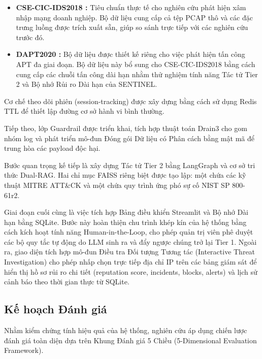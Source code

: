\documentclass[12pt,a4paper]{article}
\begin{document}
\begin{itemize}
    \item \textbf{CSE-CIC-IDS2018 \cite{sharafaldin2018}:} Tiêu chuẩn thực tế cho nghiên cứu phát hiện xâm nhập mạng doanh nghiệp. Bộ dữ liệu cung cấp cả tệp PCAP thô và các đặc trưng luồng được trích xuất sẵn, giúp so sánh trực tiếp với các nghiên cứu trước đó.
    \item \textbf{DAPT2020 \cite{dapt2020}:} Bộ dữ liệu được thiết kế riêng cho việc phát hiện tấn công APT đa giai đoạn. Bộ dữ liệu này bổ sung cho CSE-CIC-IDS2018 bằng cách cung cấp các chuỗi tấn công dài hạn nhằm thử nghiệm tính năng Tác tử Tier 2 và Bộ nhớ Rủi ro Dài hạn của SENTINEL.
\end{itemize}

Cơ chế theo dõi phiên (session-tracking) được xây dựng bằng cách sử dụng Redis TTL để thiết lập đường cơ sở hành vi bình thường.

Tiếp theo, lớp Guardrail được triển khai, tích hợp thuật toán Drain3 cho gom nhóm log và phát triển mô-đun Đóng gói Dữ liệu có Phân cách bằng mật mã để trung hòa các payload độc hại.

Bước quan trọng kế tiếp là xây dựng Tác tử Tier 2 bằng LangGraph và cơ sở tri thức Dual-RAG. Hai chỉ mục FAISS riêng biệt được tạo lập: một chứa các kỹ thuật MITRE ATT\&CK và một chứa quy trình ứng phó sự cố NIST SP 800-61r2.

Giai đoạn cuối cùng là việc tích hợp Bảng điều khiển Streamlit và Bộ nhớ Dài hạn bằng SQLite. Bước này hoàn thiện chu trình khép kín của hệ thống bằng cách kích hoạt tính năng Human-in-the-Loop, cho phép quản trị viên phê duyệt các bộ quy tắc tự động do LLM sinh ra và đẩy ngược chúng trở lại Tier 1. Ngoài ra, giao diện tích hợp mô-đun Điều tra Đối tượng Tương tác (Interactive Threat Investigation) cho phép nhấp chọn trực tiếp địa chỉ IP trên các bảng giám sát để hiển thị hồ sơ rủi ro chi tiết (reputation score, incidents, blocks, alerts) và lịch sử cảnh báo theo thời gian thực từ SQLite.

\subsection{Kế hoạch Đánh giá}
Nhằm kiểm chứng tính hiệu quả của hệ thống, nghiên cứu áp dụng chiến lược đánh giá toàn diện dựa trên Khung Đánh giá 5 Chiều (5-Dimensional Evaluation Framework).
\end{document}
